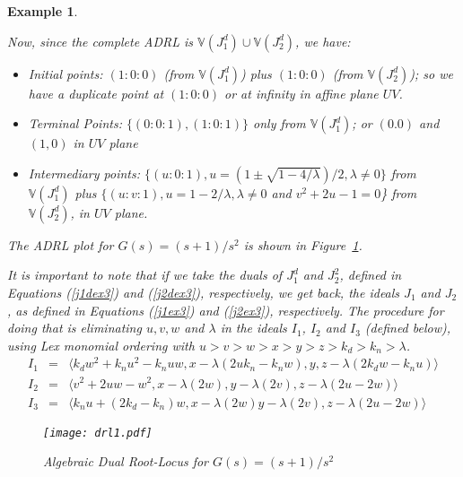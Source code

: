 \documentclass{article}
\newtheorem{example}{Example}[section]
\begin{document}
\begin{example}
\begin{description}
\begin{itemize}
\end{itemize}

\end{description}

Now, since the complete ADRL is $\mathbb V(J_1^d) \cup \mathbb V(J_2^d)$, we have:
\begin{itemize}
\item Initial points: $(1:0:0)$ (from $\mathbb V(J_1^d)$) plus $(1:0:0)$ (from $\mathbb V(J_2^d)$); so we have a duplicate 
point at $(1:0:0)$ or at infinity in affine plane $UV$.
\item Terminal Points: $\{(0:0:1), (1:0:1)\}$ only from $\mathbb V(J_1^d)$; or $(0.0)$ and $(1,0)$ in $UV$ plane 
\item Intermediary points: $\{(u:0:1), u=(1\pm\sqrt{1-4/\lambda})/2, \lambda\neq 0\}$ from 
$\mathbb V(J_1^d)$ plus $\{(u:v:1), u= 1 -2/\lambda, \lambda\neq 0$ and $v^2+2u-1=0$\} from $\mathbb V(J_2^d)$, in
$UV$ plane.
\end{itemize}
The ADRL plot for $G(s) = (s+1)/s^2$ is shown in Figure~\ref{darlex3}. 

It is important to note that if we take the duals of $J_1^d$ and $J_2^2$, defined in Equations (\ref{j1dex3}) and 
(\ref{j2dex3}), respectively, we get back, the ideals $J_1$ and $J_2$, as defined in Equations (\ref{j1ex3}) and 
(\ref{j2ex3}), respectively. The procedure for doing that is eliminating $u,v,w$ and $\lambda$ in the ideals $I_1$, 
$I_2$ and $I_3$ (defined below), using Lex monomial ordering with $u>v>w>x>y>z>k_d>k_n>\lambda$.
\begin{eqnarray*}
I_1 & = & \langle  k_dw^2+k_nu^2-k_nuw, x-\lambda(2uk_n-k_nw), y, z-\lambda(2k_dw-k_nu)\rangle\\
I_2 & = & \langle  v^2+2uw-w^2, x-\lambda(2w), y-\lambda(2v), z-\lambda(2u-2w)\rangle \\
I_3 & = & \langle  k_nu + (2k_d - k_n)w, x-\lambda(2w)y-\lambda(2v), z-\lambda(2u-2w)\rangle
\end{eqnarray*}



\begin{figure}
\begin{center}
\texttt{[image: drl1.pdf]} 
\caption{\label{darlex3} Algebraic Dual Root-Locus for $G(s)=(s+1)/s^2$} 
\end{center}
\end{figure} 



\end{example}
\end{document}
